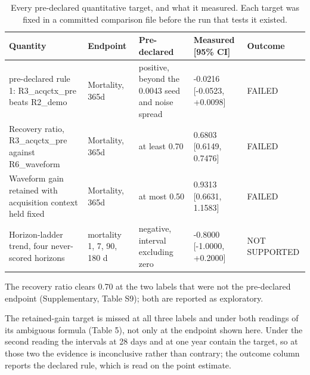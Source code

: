 \begin{table}[t]
\centering
\small
\caption{Every pre-declared quantitative target, and what it measured. Each target was fixed in a committed comparison file before the run that tests it existed.}
\label{tab:targets}
\begin{tabular}{lllll}
\toprule
Quantity & Endpoint & Pre-declared & Measured [95\% CI] & Outcome \\
\midrule
pre-declared rule 1: R3\_acqctx\_pre beats R2\_demo & Mortality, 365d & positive, beyond the 0.0043 seed and noise spread & -0.0216 [-0.0523, +0.0098] & FAILED \\
Recovery ratio, R3\_acqctx\_pre against R6\_waveform & Mortality, 365d & at least 0.70 & 0.6803 [0.6149, 0.7476] & FAILED \\
Waveform gain retained with acquisition context held fixed & Mortality, 365d & at most 0.50 & 0.9313 [0.6631, 1.1583] & FAILED \\
Horizon-ladder trend, four never-scored horizons & mortality 1, 7, 90, 180 d & negative, interval excluding zero & -0.8000 [-1.0000, +0.2000] & NOT SUPPORTED \\
\bottomrule
\end{tabular}
\par\footnotesize The recovery ratio clears 0.70 at the two labels that were not the pre-declared endpoint (Supplementary, Table S9); both are reported as exploratory.
\par\footnotesize The retained-gain target is missed at all three labels and under both readings of its ambiguous formula (Table 5), not only at the endpoint shown here. Under the second reading the intervals at 28 days and at one year contain the target, so at those two the evidence is inconclusive rather than contrary; the outcome column reports the declared rule, which is read on the point estimate.
\end{table}

